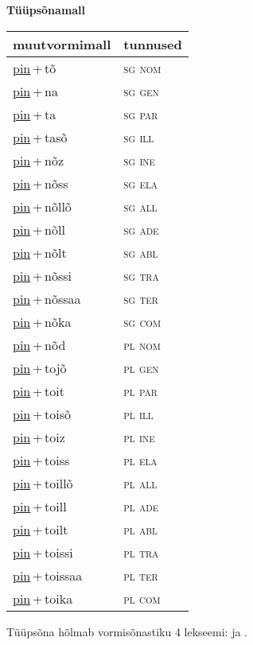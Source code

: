 
\vspace{1.8em}
\begin{minipage}{\textwidth}
\textbf{Tüüpsõnamall \,}\\

\begin{sideways}
\begin{tabular}{l l}
muutvormimall & tunnused \\
\hline
\underline{pin}\,+\,tõ & \textsc{ sg nom } \\
\underline{pin}\,+\,na & \textsc{ sg gen } \\
\underline{pin}\,+\,ta & \textsc{ sg par } \\
\underline{pin}\,+\,tasõ & \textsc{ sg ill } \\
\underline{pin}\,+\,nõz & \textsc{ sg ine } \\
\underline{pin}\,+\,nõss & \textsc{ sg ela } \\
\underline{pin}\,+\,nõllõ & \textsc{ sg all } \\
\underline{pin}\,+\,nõll & \textsc{ sg ade } \\
\underline{pin}\,+\,nõlt & \textsc{ sg abl } \\
\underline{pin}\,+\,nõssi & \textsc{ sg tra } \\
\underline{pin}\,+\,nõssaa & \textsc{ sg ter } \\
\underline{pin}\,+\,nõka & \textsc{ sg com } \\
\underline{pin}\,+\,nõd & \textsc{ pl nom } \\
\underline{pin}\,+\,tojõ & \textsc{ pl gen } \\
\underline{pin}\,+\,toit & \textsc{ pl par } \\
\underline{pin}\,+\,toisõ & \textsc{ pl ill } \\
\underline{pin}\,+\,toiz & \textsc{ pl ine } \\
\underline{pin}\,+\,toiss & \textsc{ pl ela } \\
\underline{pin}\,+\,toillõ & \textsc{ pl all } \\
\underline{pin}\,+\,toill & \textsc{ pl ade } \\
\underline{pin}\,+\,toilt & \textsc{ pl abl } \\
\underline{pin}\,+\,toissi & \textsc{ pl tra } \\
\underline{pin}\,+\,toissaa & \textsc{ pl ter } \\
\underline{pin}\,+\,toika & \textsc{ pl com } \\
\end{tabular}
\end{sideways}
\label{tab:tüüpsõnamall-pintõ}

\end{minipage}

 
\vspace{1em}
\noindent Tüüpsõna hõlmab vormisõnastiku 4 lekseemi:  ja .
